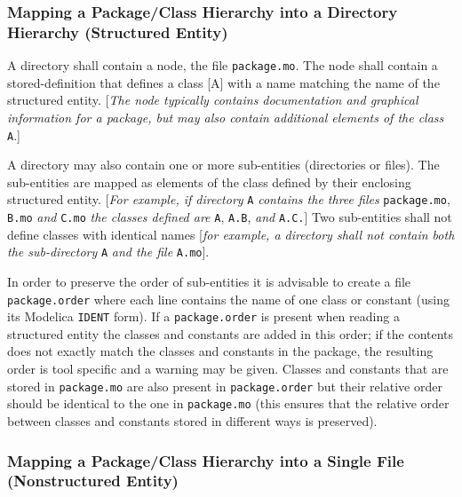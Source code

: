 \subsubsection{Mapping a Package/Class Hierarchy into a Directory Hierarchy (Structured Entity)}

A directory shall contain a node, the file \lstinline!package.mo!. The node shall contain a stored-definition that defines a class {[}A{]} with a name
matching the name of the structured entity. {[}\emph{The node typically
contains documentation and graphical information for a package, but may
also contain additional elements of the class} \lstinline!A!.{]}

A directory may also contain one or more sub-entities (directories or
files). The sub-entities are mapped as elements of the class defined by
their enclosing structured entity. {[}\emph{For example, if directory} \lstinline!A!
\emph{contains the three files} \lstinline!package.mo!, \lstinline!B.mo! \emph{and}
\lstinline!C.mo!
\emph{the classes defined are} \lstinline!A!, \lstinline!A.B!, \emph{and} \lstinline!A.C.!{]} Two
sub-entities shall not define classes with identical names {[}\emph{for
example, a directory shall not contain both the sub-directory} \lstinline!A!
\emph{and the file} \lstinline!A.mo!{]}.

In order to preserve the order of sub-entities it is advisable to create
a file \lstinline!package.order! where each line contains the name of one class or
constant (using its Modelica \lstinline!IDENT! form). If a \lstinline!package.order! is present when reading a structured entity
the classes and constants are added in this order; if the contents does
not exactly match the classes and constants in the package, the
resulting order is tool specific and a warning may be given. Classes and
constants that are stored in \lstinline!package.mo! are also present in
\lstinline!package.order! but their relative order should be identical to the one in
\lstinline!package.mo! (this ensures that the relative order between classes and
constants stored in different ways is preserved).

\subsubsection{Mapping a Package/Class Hierarchy into a Single File (Nonstructured Entity)}

